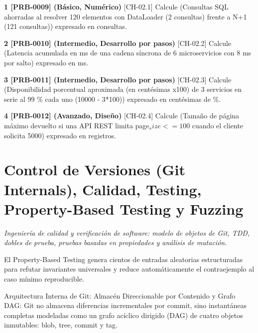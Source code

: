 \documentclass{book}
\begin{document}
\begin{tcolorbox}[title={Ejercicios}, studiumworked, breakable]

\noindent\textbf{1 [PRB-0009] (Básico, Numérico)}
[CH-02.1] Calcule (Consultas SQL ahorradas al resolver 120 elementos con DataLoader (2 consultas) frente a N+1 (121 consultas)) expresado en consultas.

\noindent\textbf{2 [PRB-0010] (Intermedio, Desarrollo por pasos)}
[CH-02.2] Calcule (Latencia acumulada en ms de una cadena síncrona de 6 microservicios con 8 ms por salto) expresado en ms.

\noindent\textbf{3 [PRB-0011] (Intermedio, Desarrollo por pasos)}
[CH-02.3] Calcule (Disponibilidad porcentual aproximada (en centésimas x100) de 3 servicios en serie al 99 \% cada uno (10000 - 3*100)) expresado en centésimas de \%.

\noindent\textbf{4 [PRB-0012] (Avanzado, Diseño)}
[CH-02.4] Calcule (Tamaño de página máximo devuelto si una API REST limita page\(_size <= 100\) cuando el cliente solicita 5000) expresado en registros.
\end{tcolorbox}

\chapter{Control de Versiones (Git Internals), Calidad, Testing, Property-Based Testing y Fuzzing}
\label{chap:ch-03}

\noindent\textit{Ingeniería de calidad y verificación de software: modelo de objetos de Git, TDD, dobles de prueba, pruebas basadas en propiedades y análisis de mutación.}

\begin{tcolorbox}[title={Consejo}, studiumtip, breakable]

El Property-Based Testing genera cientos de entradas aleatorias estructuradas para refutar invariantes universales y reduce automáticamente el contraejemplo al caso mínimo reproducible.
\end{tcolorbox}

\begin{tcolorbox}[title={Definición}, studiumdef, breakable]

Arquitectura Interna de Git: Almacén Direccionable por Contenido y Grafo DAG: Git no almacena diferencias incrementales por commit, sino instantáneas completas modeladas como un grafo acíclico dirigido (DAG) de cuatro objetos inmutables: blob, tree, commit y tag.
\end{tcolorbox}
\end{document}
